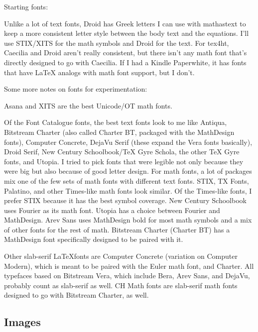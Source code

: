 \documentclass[12pt]{article}
\begin{document}
Starting fonts:

Unlike a lot of text fonts, Droid has Greek letters I can use with
mathastext to keep a more consistent letter style between the body
text and the equations.  I'll use STIX/XITS for the math symbols and
Droid for the text.  For tex4ht, Caecilia and Droid aren't really
consistent, but there isn't any math font that's directly designed to
go with Caecilia.  If I had a Kindle Paperwhite, it has fonts that
have LaTeX analogs with math font support, but I don't.


Some more notes on fonts for experimentation:

Asana and XITS are the best Unicode/OT math fonts.

Of the Font Catalogue fonts, the best text fonts look to me like
Antiqua, Bitstream Charter (also called Charter BT, packaged with the
MathDesign fonts), Computer Concrete, DejaVu Serif (these expand the
Vera fonts basically), Droid Serif, New Century Schoolbook/TeX Gyre
Schola, the other TeX Gyre fonts, and Utopia.  I tried to pick fonts
that were legible not only because they were big but also because of
good letter design.  For math fonts, a lot of packages mix one of the
few sets of math fonts with different text fonts.  STIX, TX Fonts,
Palatino, and other Times-like math fonts look similar.  Of the
Times-like fonts, I prefer STIX because it has the best symbol
coverage.  New Century Schoolbook uses Fourier as its math font.
Utopia has a choice between Fourier and MathDesign.  Arev Sans uses
MathDesign bold for most math symbols and a mix of other fonts for the
rest of math.  Bitstream Charter (Charter BT) has a MathDesign font
specifically designed to be paired with it.

Other slab-serif \LaTeX fonts are Computer Concrete (variation on
Computer Modern), which is meant to be paired with the Euler math
font, and Charter.  All typefaces based on Bitstream Vera, which
include Bera, Arev Sans, and DejaVu, probably count as slab-serif as
well.  CH Math fonts are slab-serif math fonts designed to go with
Bitstream Charter, as well.


\subsection{Images}
\label{sec:images}
\end{document}
